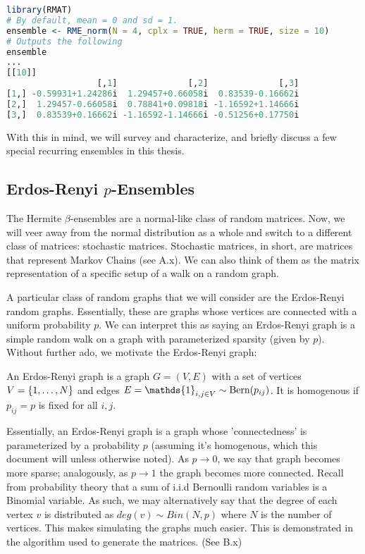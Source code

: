 \begin{lstlisting}[language=R]
library(RMAT)
# By default, mean = 0 and sd = 1.
ensemble <- RME_norm(N = 4, cplx = TRUE, herm = TRUE, size = 10)
# Outputs the following
ensemble
...
[[10]]
                  [,1]              [,2]              [,3]
[1,] -0.59931+1.24286i  1.29457+0.66058i  0.83539-0.16662i
[2,]  1.29457-0.66058i  0.78841+0.09818i -1.16592+1.14666i
[3,]  0.83539+0.16662i -1.16592-1.14666i -0.51256+0.17750i
\end{lstlisting}

With this in mind, we will survey and characterize, and briefly discuss a few special recurring ensembles in this thesis.


\subsection{Erdos-Renyi $p$-Ensembles}

The Hermite $\beta$-ensembles are a normal-like class of random matrices. Now, we will veer away from the normal distribution as a whole and switch to a different class of matrices: stochastic matrices. Stochastic matrices, in short, are matrices that represent Markov Chains (see A.x). We can also think of them as the matrix representation of a specific setup of a walk on a random graph.

A particular class of random graphs that we will consider are the Erdos-Renyi random graphs. Essentially, these are graphs whose vertices are connected with a uniform probability $p$. We can interpret this as saying an Erdos-Renyi graph is a simple random walk on a graph with parameterized sparsity (given by $p$). Without further ado, we motivate the Erdos-Renyi graph:

\begin{definition}
An Erdos-Renyi graph is a graph $G = (V,E)$ with a set of vertices $V = \{\oneto[N]\}$ and edges $E = \mathds{1}_{i,j \in V} \sim \Bern(p_{ij})$. It is homogenous if $p_{ij} = p$ is fixed for all $i, j$.
\end{definition}

Essentially, an Erdos-Renyi graph is a graph whose 'connectedness' is parameterized by a probability $p$ (assuming it's homogenous, which this document will unless otherwise noted). As $p \to 0$, we say that graph becomes more sparse; analogously, as $p \to 1$ the graph becomes more connected.\newline
\indent Recall from probability theory that a sum of i.i.d Bernoulli random variables is a Binomial variable. As such, we may alternatively say that the degree of each vertex $v$ is distributed as $deg(v) \sim Bin(N,p)$ where $N$ is the number of vertices. This makes simulating the graphs much easier. This is demonstrated in the algorithm used to generate the matrices.  (See B.x)

